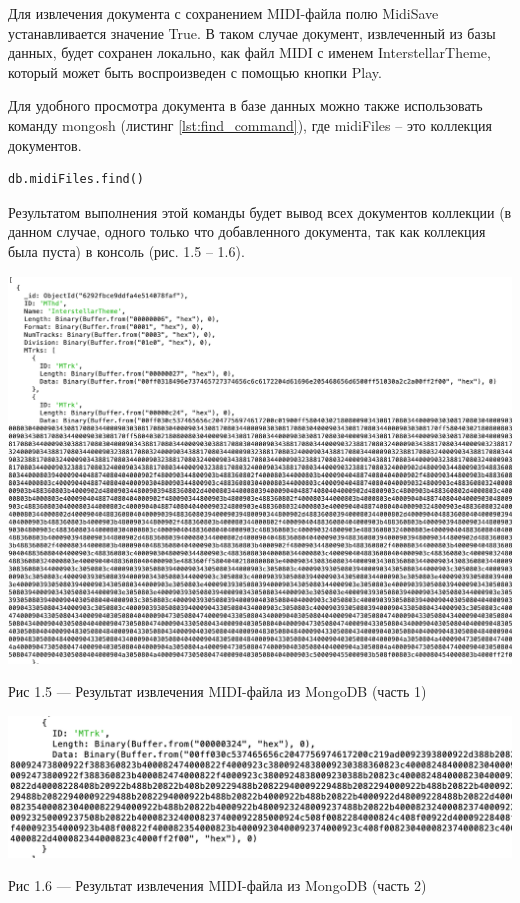 Для извлечения документа с сохранением MIDI-файла полю MidiSave устанавливается значение True. В таком случае документ, извлеченный из базы данных, будет сохранен локально, как файл MIDI с именем InterstellarTheme, который может быть воспроизведен с помощью кнопки Play.

Для удобного просмотра документа в базе данных можно также использовать команду mongosh (листинг \ref{lst:find_command}), где midiFiles -- это коллекция документов.

\begin{lstlisting}[language=sql, label=some-code, caption=Команда mongosh для просмотра документов в MongoDB, label=lst:find_command]
db.midiFiles.find()
\end{lstlisting}

Результатом выполнения этой команды будет вывод всех документов коллекции (в данном случае, одного только что добавленного документа, так как коллекция была пуста) в консоль (рис. 1.5 -- 1.6).

\begin{center}
		\includegraphics[scale=0.5]{tex/img/Console1.png}
		
			Рис 1.5 — Результат извлечения MIDI-файла из MongoDB (часть 1)
\end{center} 

\begin{center}
		\includegraphics[scale=0.6]{tex/img/Console2.png}
		
			Рис 1.6 — Результат извлечения MIDI-файла из MongoDB (часть 2)
\end{center}


